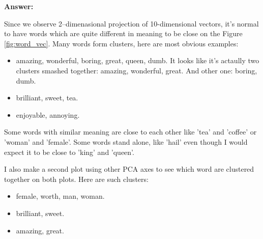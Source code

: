 \documentclass{article}
\newenvironment{answer}{
    {\bf Answer:} \sf \begingroup\color{red}
}{\endgroup}%
\begin{document}
\begin{enumerate}[label=(\alph*)]
\begin{shaded}
\begin{answer}
	Since we observe 2--dimenasional projection of 10-dimensional vectors, it's normal to have words which are quite different in meaning to be close on the Figure \ref{fig:word_vec}. Many words form clusters, here are most obvious examples:
	\begin{itemize}
		\item amazing, wonderful, boring, great, queen, dumb. It looks like it's actaully two clusters smashed together: amazing, wonderful, great. And other one: boring, dumb.
		\item brilliant, sweet, tea.
		\item enjoyable, annoying.
	\end{itemize}
	Some words with similar meaning are close to each other like 'tea' and 'coffee' or 'woman' and 'female'. Some words stand alone, like 'hail' even though I would expect it to be close to 'king' and 'queen'.
	
	I also make a second plot using other PCA axes to see which word are clustered together on both plots. Here are such clusters:
	\begin{itemize}
		\item female, worth, man, woman.
		\item brilliant, sweet.
		\item amazing, great.
	\end{itemize}
\end{answer}
\end{shaded}


\end{enumerate}
\end{document}
